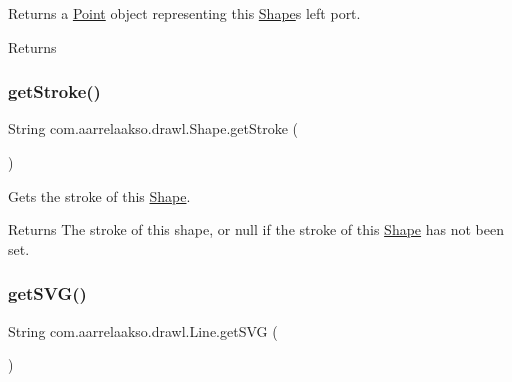 Returns a \hyperlink{classcom_1_1aarrelaakso_1_1drawl_1_1_point}{Point} object representing this \hyperlink{classcom_1_1aarrelaakso_1_1drawl_1_1_shape}{Shape}\textquotesingle{}s left port. 

\begin{DoxyReturn}{Returns}

\end{DoxyReturn}
\mbox{\label{classcom_1_1aarrelaakso_1_1drawl_1_1_shape_a4e1d54c7e161e3af5053939ddefdf9e6}} 
\subsubsection{\texorpdfstring{get\+Stroke()}{getStroke()}}
{\footnotesize\ttfamily String com.\+aarrelaakso.\+drawl.\+Shape.\+get\+Stroke (\begin{DoxyParamCaption}{ }\end{DoxyParamCaption})\hspace{0.3cm}{\ttfamily [inherited]}}



Gets the stroke of this \hyperlink{classcom_1_1aarrelaakso_1_1drawl_1_1_shape}{Shape}. 

\begin{DoxyReturn}{Returns}
The stroke of this shape, or null if the stroke of this \hyperlink{classcom_1_1aarrelaakso_1_1drawl_1_1_shape}{Shape} has not been set. 
\end{DoxyReturn}
\mbox{\label{classcom_1_1aarrelaakso_1_1drawl_1_1_line_a6a54dd70515b691c8afa88f980e10698}} 
\subsubsection{\texorpdfstring{get\+S\+V\+G()}{getSVG()}}
{\footnotesize\ttfamily String com.\+aarrelaakso.\+drawl.\+Line.\+get\+S\+VG (\begin{DoxyParamCaption}{ }\end{DoxyParamCaption})}

